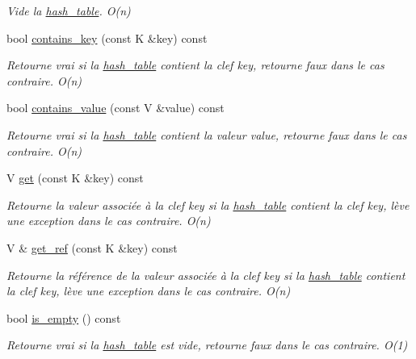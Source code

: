 \begin{DoxyCompactItemize}
\begin{DoxyCompactList}\small\item\em Vide la \hyperlink{classhash__table}{hash\-\_\-table}. O(n) \end{DoxyCompactList}\item 
bool \hyperlink{classhash__table_a95b8f8d9a6704841ec1c84dda4959329}{contains\-\_\-key} (const K \&key) const 
\begin{DoxyCompactList}\small\item\em Retourne vrai si la \hyperlink{classhash__table}{hash\-\_\-table} contient la clef key, retourne faux dans le cas contraire. O(n) \end{DoxyCompactList}\item 
bool \hyperlink{classhash__table_a317e71765a840583fe81afa8f7a431ca}{contains\-\_\-value} (const V \&value) const 
\begin{DoxyCompactList}\small\item\em Retourne vrai si la \hyperlink{classhash__table}{hash\-\_\-table} contient la valeur value, retourne faux dans le cas contraire. O(n) \end{DoxyCompactList}\item 
V \hyperlink{classhash__table_a91816c9092bd1b98ca52a0955df43752}{get} (const K \&key) const 
\begin{DoxyCompactList}\small\item\em Retourne la valeur associée à la clef key si la \hyperlink{classhash__table}{hash\-\_\-table} contient la clef key, lève une exception dans le cas contraire. O(n) \end{DoxyCompactList}\item 
V \& \hyperlink{classhash__table_a3a8ce67c4dd3952ca1a5b05f2ed0b5a6}{get\-\_\-ref} (const K \&key) const 
\begin{DoxyCompactList}\small\item\em Retourne la référence de la valeur associée à la clef key si la \hyperlink{classhash__table}{hash\-\_\-table} contient la clef key, lève une exception dans le cas contraire. O(n) \end{DoxyCompactList}\item 
bool \hyperlink{classhash__table_a3a81ed200333cf7fd4745ed6f0195fd3}{is\-\_\-empty} () const 
\begin{DoxyCompactList}\small\item\em Retourne vrai si la \hyperlink{classhash__table}{hash\-\_\-table} est vide, retourne faux dans le cas contraire. O(1) \end{DoxyCompactList}\item 

\end{DoxyCompactItemize}
